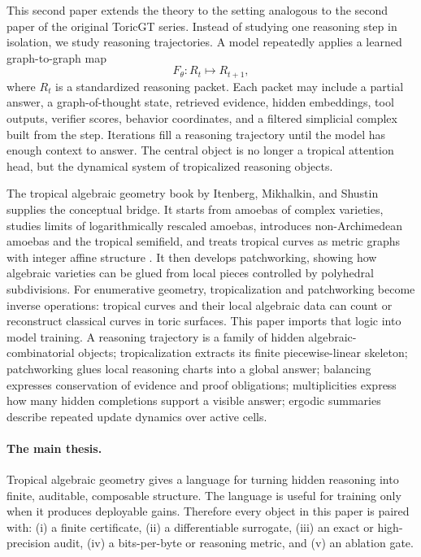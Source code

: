 \documentclass[11pt]{article}
\begin{document}
This second paper extends the theory to the setting analogous to the second paper of the original ToricGT series.  Instead of studying one reasoning step in isolation, we study reasoning trajectories.  A model repeatedly applies a learned graph-to-graph map
\begin{equation}
F_\theta:R_t\longmapsto R_{t+1},
\end{equation}
where \(R_t\) is a standardized reasoning packet.  Each packet may include a partial answer, a graph-of-thought state, retrieved evidence, hidden embeddings, tool outputs, verifier scores, behavior coordinates, and a filtered simplicial complex built from the step.  Iterations fill a reasoning trajectory until the model has enough context to answer.  The central object is no longer a tropical attention head, but the dynamical system of tropicalized reasoning objects.

The tropical algebraic geometry book by Itenberg, Mikhalkin, and Shustin supplies the conceptual bridge.  It starts from amoebas of complex varieties, studies limits of logarithmically rescaled amoebas, introduces non-Archimedean amoebas and the tropical semifield, and treats tropical curves as metric graphs with integer affine structure \cite{itenberg2009}.  It then develops patchworking, showing how algebraic varieties can be glued from local pieces controlled by polyhedral subdivisions.  For enumerative geometry, tropicalization and patchworking become inverse operations: tropical curves and their local algebraic data can count or reconstruct classical curves in toric surfaces.  This paper imports that logic into model training.  A reasoning trajectory is a family of hidden algebraic-combinatorial objects; tropicalization extracts its finite piecewise-linear skeleton; patchworking glues local reasoning charts into a global answer; balancing expresses conservation of evidence and proof obligations; multiplicities express how many hidden completions support a visible answer; ergodic summaries describe repeated update dynamics over active cells.

\paragraph{The main thesis.}
Tropical algebraic geometry gives a language for turning hidden reasoning into finite, auditable, composable structure.  The language is useful for training only when it produces deployable gains.  Therefore every object in this paper is paired with: (i) a finite certificate, (ii) a differentiable surrogate, (iii) an exact or high-precision audit, (iv) a bits-per-byte or reasoning metric, and (v) an ablation gate.
\end{document}
